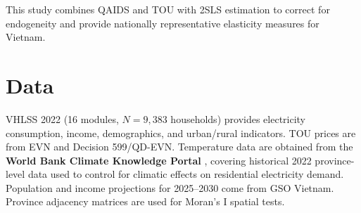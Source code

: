 \documentclass[12pt,a4paper]{article}
\begin{document}
	This study combines QAIDS and TOU with 2SLS estimation to correct for endogeneity and provide nationally representative elasticity measures for Vietnam.
	
	\begin{table}[H]
		\centering
		\caption{Selected Empirical Studies on Residential Electricity Demand and TOU Pricing}
		\label{tab:lit_review}
	\end{table}
	
	\section{Data}
	VHLSS 2022 (16 modules, $N=9{,}383$ households) provides electricity consumption, income, demographics, and urban/rural indicators. TOU prices are from EVN and Decision 599/QD-EVN. Temperature data are obtained from the \textbf{World Bank Climate Knowledge Portal} \citep{worldbankclimate}, covering historical 2022 province-level data used to control for climatic effects on residential electricity demand. Population and income projections for 2025--2030 come from GSO Vietnam. Province adjacency matrices are used for Moran's I spatial tests.
	
\end{document}
